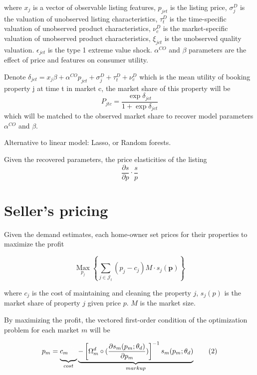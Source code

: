 \documentclass{article}
\begin{document}
where  $x_j$ is a vector of observable listing features, $p_{jrt}$ is the listing price,  $\sigma_j^D$ is the valuation of unobserved listing characteristics, $\tau_t^D$ is the time-specific valuation of unobserved product characteristics, $\nu_c^D$ is the market-specific valuation of unobserved product characteristics, $	\xi_{jct}$ is the unobserved quality valuation. $\epsilon_{jct}$ is the type 1 extreme value shock. $\alpha^{CO} $ and $\beta$ parameters are the effect of price and features on consumer utility. %



Denote $\delta_{jct} =x_j\beta+\alpha^{CO} p_{jct}+\sigma_j^D+\tau_t^D+\nu_c^D $ which is the mean utility of booking property j at time t in market c, the market share of this property will be  
\[
P_{jtc} = \frac{\exp{\delta_{jct}}}{1+\exp{\delta_{jct}}}\tag{1}\] which will be matched to the observed market share to recover model parameters  $\alpha^{CO} $ and $\beta$.

Alternative to linear model: Lasso, or Random forests.

Given the recovered parameters, the price elasticities of the listing $$\frac{\partial s}{\partial p}\cdot\frac{s}{p}$$ 


\section{Seller's pricing}

Given the demand estimates, each home-owner set prices for their properties to maximize the profit


$$\underset{p_{j}}{\operatorname{Max}}\left\{\sum_{j \in \mathcal{J}_{t}}\left(p_{j}-c_{j}\right) M \cdot s_{j}(\mathbf{p})\right\}$$

where $c_{j}$ is the cost of maintaining and cleaning the property $j$, $s_j(p)$ is the market share of property $j$ given price $p$. $M$ is the market size. 

By maximizing the profit, the vectored first-order condition of the optimization problem for each market $m$ will be 

\[p_m = \underbrace{c_m \textcolor{white}{\frac{a_a}{a^a}}}_{cost} \underbrace{-\left[\Omega_m^d\circ (\frac{\partial s_m(p_m;\theta_{d})}{\partial p_m})\right]^{-1} s_m(p_m;\theta_{d}) }_{markup}
\tag{2}
\] 
\end{document}
